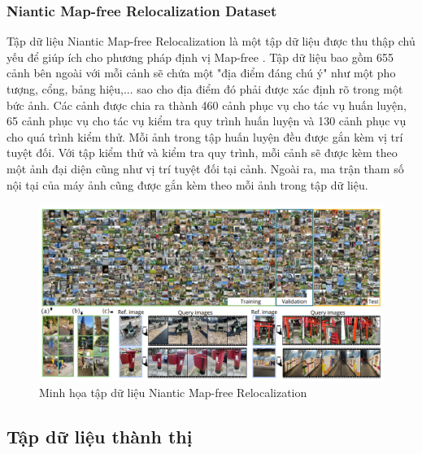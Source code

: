 \subsubsection*{Niantic Map-free Relocalization Dataset}
Tập dữ liệu Niantic Map-free Relocalization \cite{arnold2022mapfree} là một tập dữ liệu được thu thập chủ yếu để giúp ích cho phương pháp định vị Map-free \cite{arnold2022mapfree}. Tập dữ liệu bao gồm 655 cảnh bên ngoài với mỗi cảnh sẽ chứa một "địa điểm đáng chú ý" như một pho tượng, cổng, bảng hiệu,... sao cho địa điểm đó phải được xác định rõ trong một bức ảnh. Các cảnh được chia ra thành 460 cảnh phục vụ cho tác vụ huấn luyện, 65 cảnh phục vụ cho tác vụ kiểm tra quy trình huấn luyện và 130 cảnh phục vụ cho quá trình kiểm thử. Mỗi ảnh trong tập huấn luyện đều được gắn kèm vị trí tuyệt đối. Với tập kiểm thử và kiểm tra quy trình, mỗi cảnh sẽ được kèm theo một ảnh đại diện cũng như vị trí tuyệt đối tại cảnh. Ngoài ra, ma trận tham số nội tại của máy ảnh cũng được gắn kèm theo mỗi ảnh trong tập dữ liệu.
\begin{figure}[H]
    \centering
    \includegraphics[width=\textwidth]{pics/Chapter2/niantic.png}
    \caption{Minh họa tập dữ liệu Niantic Map-free Relocalization \cite{arnold2022mapfree}}
\end{figure}
\subsection{Tập dữ liệu thành thị}
